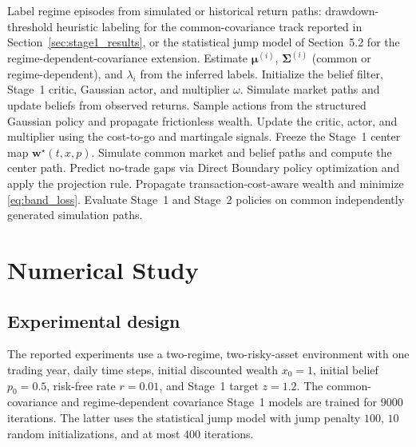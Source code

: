 \documentclass[a4paper,10pt]{article}
\newcommand{\bmu}{\bm{\mu}}
\newcommand{\bw}{\bm{w}}
\newcommand{\bSigma}{\bm{\Sigma}}
\begin{document}
\begin{algorithm}[H]
\caption{Two-stage structure-guided learning procedure}
\label{alg:unified}
\begin{algorithmic}[1]
\State Label regime episodes from simulated or historical return paths: drawdown-threshold heuristic labeling for the common-covariance track reported in Section~\ref{sec:stage1_results}, or the statistical jump model of Section~5.2 for the regime-dependent-covariance extension.
\State Estimate $\bmu^{(i)}$, $\bSigma^{(i)}$ (common or regime-dependent), and $\lambda_i$ from the inferred labels.
\State Initialize the belief filter, Stage~1 critic, Gaussian actor, and multiplier $\omega$.
  \State Simulate market paths and update beliefs from observed returns.
  \State Sample actions from the structured Gaussian policy and propagate frictionless wealth.
  \State Update the critic, actor, and multiplier using the cost-to-go and martingale signals.
\EndFor
\State Freeze the Stage~1 center map $\bw^\star(t,x,p)$.
  \State Simulate common market and belief paths and compute the center path.
  \State Predict no-trade gaps via Direct Boundary policy optimization and apply the projection rule.
  \State Propagate transaction-cost-aware wealth and minimize \eqref{eq:band_loss}.
\EndFor
\State Evaluate Stage~1 and Stage~2 policies on common independently generated simulation paths.
\end{algorithmic}
\end{algorithm}

\section{Numerical Study}

\subsection{Experimental design}
\label{sec:experimental_design}

The reported experiments use a two-regime, two-risky-asset environment with one trading year, daily time steps, initial discounted wealth $x_0=1$, initial belief $p_0=0.5$, risk-free rate $r=0.01$, and Stage~1 target $z=1.2$. The common-covariance and regime-dependent covariance Stage~1 models are trained for $9000$ iterations. The latter uses the statistical jump model with jump penalty $100$, $10$ random initializations, and at most $400$ iterations.
\end{document}
